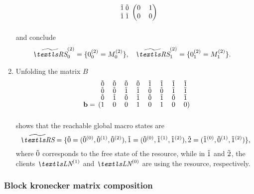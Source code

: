 \begin{runningExample}
\begin{enumerate}
\begin{equation}
\begin{blockarray}{r*{2}{@{\mkern5mu}>{$\bgroup\small$}c<{$\egroup$}}*{2}{>{$\bgroup\small$}c<{$\egroup$}}}
\begin{block}{r*{2}{@{\mkern5mu}>{$\bgroup\small$}c<{$\egroup$}}(*{2}{c})}
          & \macro{1} & \macro{0} & 0 & 1 \\
          & \macro{1} & \macro{1} & 0 & 0 \\
      \end{blockarray}
    \end{equation}
    and conclude
    \begin{align}
      \loc{\Macro{\RS}}{2}_0
      &= \{ \loc{0}{2}_0 = \loc{M}{2}_0\},
      &\loc{\Macro{\RS}}{2}_1
      &= \{ \loc{0}{2}_1 = \loc{M}{2}_1 \}.
    \end{align}
  \item Unfolding the matrix $B$
    \begin{equation}
      \begin{blockarray}{r@{\mkern15mu}*{8}{>{$\bgroup\small$}c<{$\egroup$}}}
        & \macro{0} & \macro{0} & \macro{0} & \macro{0} & \macro{1} &
        \macro{1} & \macro{1} & \macro{1} \\[-0.5ex]
        & \macro{0} & \macro{0} & \macro{1} & \macro{1} & \macro{0} &
        \macro{0} & \macro{1} & \macro{1} \\[-0.5ex]
        & \macro{0} & \macro{1} & \macro{0} & \macro{1} & \macro{0} &
        \macro{1} & \macro{0} & \macro{1} \\[-0.5ex]
        \begin{block}{r@{\mkern15mu}(*{8}{c})}
          \vec{b} = & 1 & 0 & 0 & 1 & 0 & 1 & 0 & 0 \\
        \end{block}
      \end{blockarray}
    \end{equation}
    shows that the reachable global macro states are
    \begin{equation}
      \Macro{\RS} = \{ \macro{0} = ( \loc{\macro{0}}{0},
      \loc{\macro{0}}{1}, \loc{\macro{0}}{2} ),
      \macro{1} = ( \loc{\macro{0}}{0},
      \loc{\macro{1}}{1}, \loc{\macro{1}}{2} ),
      \macro{2} = ( \loc{\macro{1}}{0},
      \loc{\macro{0}}{1}, \loc{\macro{1}}{2} ) \} \text,
    \end{equation}
    where $\tilde{0}$ corresponds to the free state of the resource,
    while in $\tilde{1}$ and $\tilde{2}$, the clients $\LN{1}$ and
    $\LN{0}$ are using the resource, respectively.
  \end{enumerate}
\end{runningExample}

\subsubsection{Block kronecker matrix composition}

